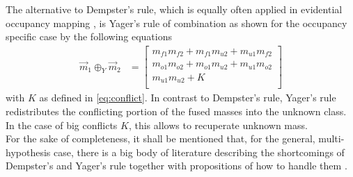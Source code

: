 The alternative to Dempster's rule, which is equally often applied in evidential occupancy mapping \cite{wirges2018evidential,kurdej2012map,reineking2013evidential}, is Yager's rule of combination \cite{yager1987dempster} as shown for the occupancy specific case by the following equations
\begin{align}
	\label{eq:yagers_rule}
	\vec{m}_1 \oplus_Y \vec{m}_2 &=  
	\begin{bmatrix} 
		m_{f1}m_{f2} + m_{f1}m_{u2} + m_{u1}m_{f2}\\
		m_{o1}m_{o2} + m_{o1}m_{u2} + m_{u1}m_{o2}\\
		m_{u1}m_{u2} + K\\
	\end{bmatrix}
\end{align}
with $K$ as defined in \eqref{eq:conflict}. In contrast to Dempster's rule, Yager's rule redistributes the conflicting portion of the fused masses into the unknown class. In the case of big conflicts $K$, this allows to recuperate unknown mass.
\\
For the sake of completeness, it shall be mentioned that, for the general, multi-hypothesis case, there is a big body of literature describing the shortcomings of Dempster's and Yager's rule together with propositions of how to handle them \cite{zadeh1979validity,han2008modified,yang2013evidential,zhang2020new}. 
%
